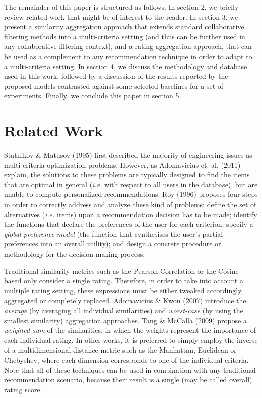 \documentclass[sigconf,authordraft]{acmart}
\begin{document}
The remainder of this paper is structured as follows. In section 2, we briefly review related work that might be of interest to the reader. In section 3, we present a similarity aggregation approach that extends standard collaborative filtering methods into a multi-criteria setting (and thus can be further used in any collaborative filtering context), and a rating aggregation approach, that can be used as a complement to any recommendation technique in order to adapt to a multi-criteria setting. In section 4, we discuss the methodology and database used in this work, followed by a discussion of the results reported by the proposed models contrasted against some selected baselines for a set of experiments. Finally, we conclude this paper in section 5.

\section{Related Work}

Statnikov \& Matusov (1995) first described the majority of engineering issues as multi-criteria optimization problems. However, as Adomavicius et. al. (2011) explain, the solutions to these problems are typically designed to find the items that are optimal in general (\textit{i.e.} with respect to all users in the database), but are unable to compute personalized recommendations. Roy (1996) proposes four steps in order to correctly address and analyze these kind of problems: define the set of alternatives (\textit{i.e.} items) upon a recommendation decision has to be made; identify the functions that declare the preferences of the user for each criterion; specify a \textit{global preference model} (the function that synthesises the user's partial preferences into an overall utility); and design a concrete procedure or methodology for the decision making process.

Traditional similarity metrics such as the Pearson Correlation or the Cosine-based only consider a single rating. Therefore, in order to take into account a multiple rating setting, these expressions must be either tweaked accordingly, aggregated or completely replaced. Adomavicius \& Kwon (2007) introduce the \textit{average} (by averaging all individual similarities) and \textit{worst-case} (by using the smallest similarity) aggregation approaches. Tang \& McCalla (2009) propose a \textit{weighted sum} of the similarities, in which the weights represent the importance of each individual rating. In other works, it is preferred to simply employ the inverse of a multidimensional distance metric such as the Manhattan, Euclidean or Chebyshev, where each dimension corresponds to one of the individual criteria. Note that all of these techniques can be used in combination with any traditional recommendation scenario, because their result is a single (may be called overall) rating score.
\end{document}
